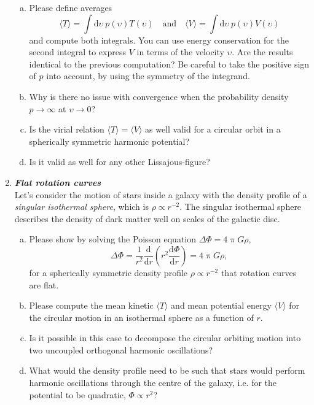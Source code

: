 \documentclass[a4paper,12pt]{article}
\newcommand{\question}[1]{\textbf{\textit{#1}}}
\newcommand{\dd}{\mathrm{d}}
\renewcommand{\pi}{\uppi}
\newcommand{\bra}{\langle}
\newcommand{\ket}{\rangle}
\begin{document}
\begin{enumerate}
\begin{enumerate}[(a)]
\item{Please define averages
\begin{equation}
\bra T\ket = \int\dd\upsilon\:p(\upsilon)T(\upsilon)
\quad\mathrm{and}\quad
\bra V\ket = \int\dd\upsilon\:p(\upsilon)V(\upsilon)
\end{equation}
and compute both integrals. You can use energy conservation for the second integral to express $V$ in terms of the velocity $\upsilon$. Are the results identical to the previous computation? Be careful to take the positive sign of $p$ into account, by using the symmetry of the integrand.
}
\item{Why is there no issue with convergence when the probability density $p\rightarrow\infty$ at $\upsilon\rightarrow0$?}
\item{Is the virial relation $\bra T\ket = \bra V\ket$ as well valid for a circular orbit in a spherically symmetric harmonic potential?}
\item{Is it valid as well for any other Lissajous-figure?}
\end{enumerate}


\item \question{Flat rotation curves}\\
Let's consider the motion of stars inside a galaxy with the density profile of a {\em singular isothermal sphere}, which is $\rho\propto r^{-2}$. The singular isothermal sphere describes the density of dark matter well on scales of the galactic disc.
\begin{enumerate}[(a)]
\item{Please show by solving the Poisson equation $\Delta\Phi = 4\pi G\rho$,
\begin{equation}
\Delta\Phi = \frac{1}{r^2}\frac{\dd}{\dd r}\left(r^2\frac{\dd\Phi}{\dd r}\right) = 4\pi G\rho,
\end{equation}
for a spherically symmetric density profile $\rho\propto r^{-2}$ that rotation curves are flat.}
\item{Please compute the mean kinetic $\bra T\ket$ and mean potential energy $\bra V\ket$ for the circular motion in an isothermal sphere as a function of $r$.}
\item{Is it possible in this case to decompose the circular orbiting motion into two uncoupled orthogonal harmonic oscillations?}
\item{What would the density profile need to be such that stars would perform harmonic oscillations through the centre of the galaxy, i.e. for the potential to be quadratic, $\Phi\propto r^{2}$?}
\end{enumerate}



\end{enumerate}
\end{document}
